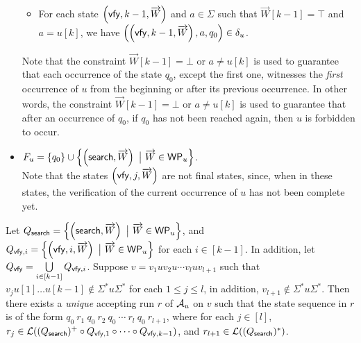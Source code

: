 \begin{definition}
\begin{itemize}
\begin{itemize}
		\item For each state $\left(\mathsf{vfy}, k-1, \overrightarrow{W} \right)$ and $a \in \Sigma$ such that $\overrightarrow{W}[k-1]=\top$ and $a  = u[k]$, we have $\left(\left(\mathsf{vfy}, k-1, \overrightarrow{W} \right), a, q_0\right) \in \delta_u$.
	\end{itemize}
Note that the constraint $\overrightarrow{W}[k-1] = \bot$ or $a \neq u[k]$ is used to guarantee that each occurrence of the state $q_0$, except the first one, witnesses the \emph{first} occurrence of $u$ from the beginning or after its previous occurrence. In other words, the constraint $\overrightarrow{W}[k-1] = \bot$ or $a \neq u[k]$ is used to guarantee that after an occurrence of $q_0$, if $q_0$ has not been reached again,  then $u$ is forbidden to occur.

	\item $F_u= \left\{q_0 \right\} \cup \left\{\left(\search, \overrightarrow{W} \right)\ \big\vert\ \overrightarrow{W} \in \wprof_{u} \right\} $. \\
	Note that the states $\left(\mathsf{vfy}, j, \overrightarrow{W} \right)$ are not final states, since, when in these states, the verification of the current occurrence of $u$ has not been complete yet.
\end{itemize}
\end{definition}

Let $Q_{\mathsf{search}}  = \left\{ \left(\mathsf{search}, \overrightarrow{W} \right) \ \big\vert\ \overrightarrow{W} \in \mathsf{WP}_{u} \right\}$,  and $Q_{\verify, i} = \left\{ \left(\verify, i, \overrightarrow{W} \right) \ \big\vert\ \overrightarrow{W} \in \wprof_{u} \right\}$ for each $i \in [k-1]$. In addition, let $Q_{\mathsf{vfy}} = \bigcup \limits_{i \in [k-1]} Q_{\mathsf{vfy},i}$.
Suppose $v = v_1 u v_2 u \cdots v_l u v_{l+1}$ such that $v_j u[1] \dots u[k-1] \not \in \Sigma^\ast u \Sigma^\ast$ for each $1 \le j \le l$, in addition, $v_{l+1} \not \in \Sigma^\ast u \Sigma^\ast$. Then there exists a \emph{unique} accepting run $r$ of $\mathcal{A}_u$ on $v$ such that the state sequence in $r$ is of the form
$q_0\ r_1\ q_0\ r_2\ q_0\ \cdots\ r_l\ q_0\ r_{l+1}$, where for each $j \in [l]$, $r_j \in  \mathcal{L}((Q_{\mathsf{search}})^+ \circ Q_{\mathsf{vfy}, 1} \circ \cdots  \circ Q_{\mathsf{vfy}, k-1})$, and $r_{l+1} \in \mathcal{L}((Q_{\mathsf{search}})^*)$.

